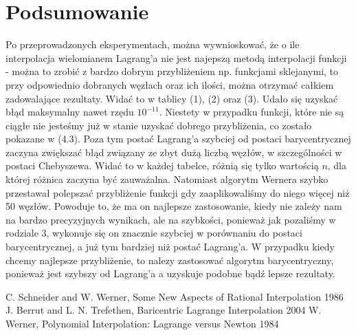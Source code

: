 \documentclass[11pt, wide]{article}
\begin{document}
\section{Podsumowanie}
Po przeprowadzonych eksperymentach, można wywnioskować, że o ile interpolacja
wielomianem Lagrang'a nie jest najepszą metodą interpolacji funkcji - można to zrobić 
z bardzo dobrym przybliżeniem np. funkcjami sklejanymi, to przy odpowiednio dobranych węzłach oraz
ich ilości, można otrzymać całkiem zadowalające rezultaty. Widać to w tablicy (1), (2) oraz (3). Udało się
uzyskać błąd maksymalny nawet rzędu $10^{-11}$. Niestety w przypadku funkcji, które nie są ciągłe nie jesteśmy już w stanie
uzyskać dobrego przybliżenia, co zostało pokazane w (4.3). Poza tym postać Lagrang'a szybciej od postaci barycentrycznej zaczyna
zwiększać błąd związany ze zbyt dużą liczbą węzłów, w szczególności w postaci Chebyszewa. Widać to w każdej tabelce,
różnią się tylko wartością $n$, dla której różnica zaczyna być zauważalna. Natomiast algorytm
Wernera szybko przestawał polepszać przybliżenie funkcji gdy zaaplikowaliśmy do niego więcej niż 50 węzłów. 
Powoduje to, że ma on najlepsze zastosowanie, kiedy nie zależy nam na bardzo precyzyjnych wynikach, ale na szybkości, ponieważ
jak pozaliśmy w rodziale 3, wykonuje się on znacznie szybciej w porównaniu do postaci barycentrycznej, a już tym bardziej niż 
postać Lagrang'a. W przypadku kiedy chcemy najlepsze przybliżenie, to nalezy zastosować algorytm barycentryczny, ponieważ jest szybszy od Lagrang'a a uzyskuje
podobne bądź lepsze rezultaty. 
\begin{thebibliography}{9}
    \itemsep2pt
     C. Schneider and W. Werner, Some New Aspects of Rational Interpolation 1986
     J. Berrut and L. N. Trefethen, Baricentric Lagrange Interpolation 2004
     W. Werner, Polynomial Interpolation: Lagrange versus Newton 1984
\end{thebibliography}    
\end{document}
